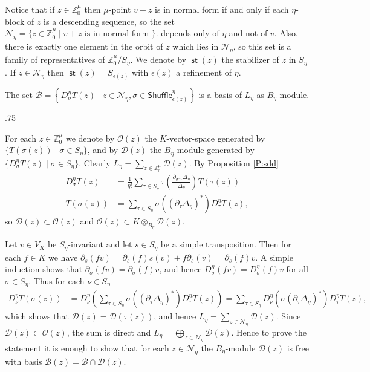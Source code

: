 \documentclass[11pt,fleqn]{article}
\makeatletter
\renewenvironment{proof}[1][\textit{Proof}]{\par
  \pushQED{\qed}%
  \normalfont \topsep.75\paraskip\relax
  \trivlist
  \item[\hskip\labelsep
        \itshape
    #1\@addpunct{.}]\ignorespaces
}{%
  \popQED\endtrivlist\@endpefalse
}
\newcommand\ZZ{\mathbb Z}
\newcommand\DD{\mathcal D}
\newcommand\N{\mathcal N}
\renewcommand\O{\mathcal O}
\newcommand\ot{\otimes}
\newcommand\Shuffle{\mathsf{Shuffle}}
\DeclareMathOperator\st{\mathsf{st}}
\makeatother
\begin{document}
Notice that if $z \in \ZZ^\mu_0$ then $\mu$-point $v+z$ is in normal form if 
and only if each $\eta$-block of $z$ is a descending sequence, so the set
$\N_\eta = \{z \in \ZZ^\mu_0 \mid v+z \mbox{ is in normal form }\}$.
depends only of $\eta$ and not of $v$. Also, there is exactly one 
element in the orbit of $z$ which lies in $\N_\eta$, so this set is a family
of representatives of $\ZZ^\mu_0 / S_\eta$. We denote by $\st(z)$ the 
stabilizer of $z$ in $S_\eta$. If $z \in \N_\eta$ then $\st(z) = 
S_{\epsilon(z)}$ with $\epsilon(z)$ a refinement of $\eta$.  
\begin{Lemma*}
The set $\mathcal B =\left\{D_\sigma^\eta T(z) \mid z \in \N_\eta, \sigma \in 
\Shuffle_{\epsilon(z)}^\eta\right\}$ is a basis of $L_\eta$ as $B_\eta$-module.
\end{Lemma*}
\begin{proof}
For each $z \in \ZZ^\mu_0$ we denote by $\O(z)$ the $K$-vector-space generated 
by $\{T(\sigma(z)) \mid \sigma \in S_\eta\}$, and by $\DD(z)$ the 
$B_\eta$-module generated by $\{D_\sigma^\eta T(z) \mid \sigma \in S_\eta \}$. 
Clearly $L_\eta = \sum_{z \in \ZZ_0^\mu} \DD(z)$. By Proposition \ref{P:sdd}
\begin{align*}
D_\sigma^\eta T(z)
  &= \frac{1}{\eta!}\sum_{\tau \in S_\eta} \tau \left(
    \frac{\partial_{\sigma^{-1}}\Delta_\eta}{\Delta_\eta} 
    \right) T(\tau(z)) \\
T(\sigma (z)) &= \sum_{\tau \in S_\eta} \sigma((\partial_{\tau} \Delta_\eta)^*)
  D_\tau^\eta T(z),
\end{align*}
so $\DD(z) \subset \O(z)$ and $\O(z) \subset K \ot_{B_\eta} \DD(z)$. 

Let $v \in V_K$ be $S_\eta$-invariant and let $s \in S_\eta$ be a simple 
transposition. Then for each $f \in K$ we have $\partial_s(f v) = 
\partial_s(f) s(v) +  f \partial_s(v) = \partial_s(f) v$. A simple induction 
shows that $\partial_\sigma(fv) = \partial_\sigma(f) v$, and hence 
$D_\sigma^\eta(f v) = D_\sigma^\eta(f) v$ for all $\sigma \in S_\eta$.
Thus for each $\nu \in S_\eta$
\begin{align*}
D_\nu^\eta T(\sigma (z))
  &= D_\nu^\eta \left(
    \sum_{\tau \in S_\eta} \sigma((\partial_{\tau} \Delta_\eta)^*)
  D_\tau^\eta T(z)
  \right)
  = \sum_{\tau \in S_\eta} D_\nu^\eta(\sigma(\partial_{\tau} \Delta_\eta)^* )
  D_\tau^\eta T(z),
\end{align*}
which shows that $\DD(z) = \DD(\tau(z))$, and hence $L_\eta = \sum_{z \in 
\N_\eta} \DD(z)$. Since $\DD(z) \subset \O(z)$, the sum is direct and 
$L_\eta = \bigoplus_{z \in \N_\eta} \DD(z)$. Hence to prove the statement it 
is enough to show that for each $z \in \N_\eta$ the $B_\eta$-module $\DD(z)$ 
is free with basis $\mathcal B(z) = \mathcal B \cap \DD(z)$.


\end{proof}
\end{document}
